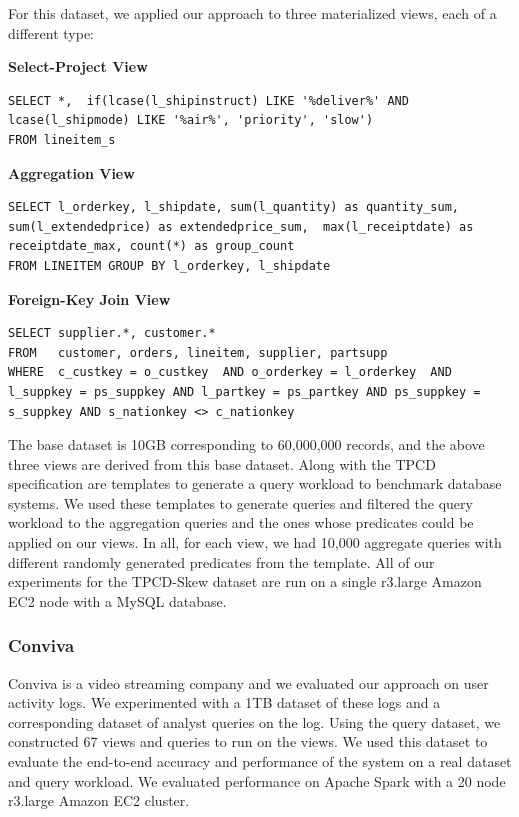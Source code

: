For this dataset, we applied our approach to three materialized views, each of a different type:
\vspace{0.5em}


\textbf{Select-Project View}
\begin{lstlisting}
SELECT *,  if(lcase(l_shipinstruct) LIKE '%deliver%' AND lcase(l_shipmode) LIKE '%air%', 'priority', 'slow')  
FROM lineitem_s
\end{lstlisting}

\vspace{0.5em}

\textbf{Aggregation View}
\begin{lstlisting}
SELECT l_orderkey, l_shipdate, sum(l_quantity) as quantity_sum,  sum(l_extendedprice) as extendedprice_sum,  max(l_receiptdate) as receiptdate_max, count(*) as group_count 
FROM LINEITEM GROUP BY l_orderkey, l_shipdate
\end{lstlisting}

\vspace{0.5em}

\textbf{Foreign-Key Join View}
\begin{lstlisting}
SELECT supplier.*, customer.* 
FROM   customer, orders, lineitem, supplier, partsupp 
WHERE  c_custkey = o_custkey  AND o_orderkey = l_orderkey  AND l_suppkey = ps_suppkey AND l_partkey = ps_partkey AND ps_suppkey = s_suppkey AND s_nationkey <> c_nationkey
\end{lstlisting}

\vspace{1em}

The base dataset is 10GB corresponding to 60,000,000 records, and the above three views are derived from this base dataset.
Along with the TPCD specification are templates to generate a query workload to benchmark database systems.
We used these templates to generate queries and filtered the query workload to the aggregation queries and the ones whose predicates could be applied on our views.
In all, for each view, we had 10,000 aggregate queries with different randomly generated predicates from the template.
All of our experiments for the TPCD-Skew dataset are run on a single r3.large Amazon EC2 node with a MySQL database.

\subsubsection{Conviva}
Conviva is a video streaming company and we evaluated our approach on user activity logs.
We experimented with a 1TB dataset of these logs and a corresponding dataset of analyst queries on the log.
Using the query dataset, we constructed 67 views and queries to run on the views.
We used this dataset to evaluate the end-to-end accuracy and performance of the system on a real dataset and query workload.
We evaluated performance on Apache Spark with a 20 node r3.large Amazon EC2 cluster. 

